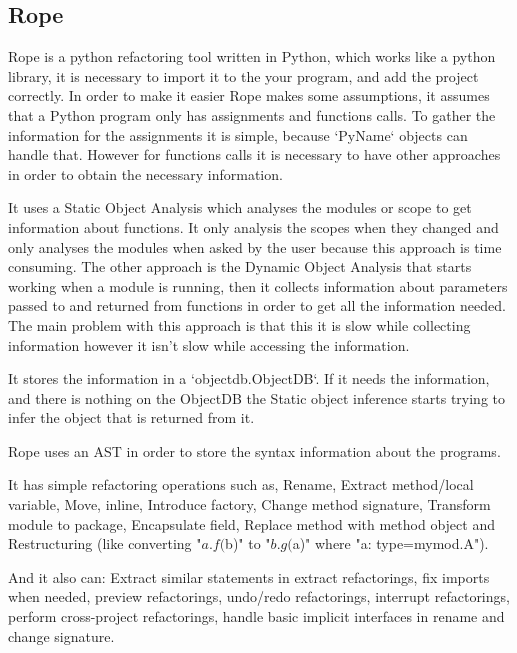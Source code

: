 
\subsection{Rope}

Rope is a python refactoring tool written in Python, which works like a python library, it is necessary to import it to the your program, and add the project correctly.
In order to make it easier Rope makes some assumptions, it assumes that a Python program only has assignments and functions calls. %
To gather the information for the assignments it is simple, because `PyName` objects can handle that. However for functions calls it is necessary to have other approaches in order to obtain the necessary information. 

It uses a Static Object Analysis which analyses the modules or scope to get information about functions. It only analysis the scopes when they changed and only analyses the modules when asked by the user because this approach is time consuming. The other approach is the Dynamic Object Analysis that starts working when a module is running, then it collects information about parameters passed to and returned from functions in order to get all the information needed. The main problem with this approach is that this it is slow while collecting information however it isn't slow while accessing the information.

It stores the information in a `objectdb.ObjectDB`. If it needs the information, and there is nothing on the ObjectDB the Static object inference starts trying to infer the object that is returned from it.

Rope uses an AST in order to store the syntax information about the programs.

It has simple refactoring operations such as, Rename, Extract method/local variable, Move, inline, Introduce factory, Change method signature, Transform module to package, Encapsulate field, Replace method with method object and Restructuring (like converting "${a}.f(${b})" to "${b}.g(${a})" where "a: type=mymod.A").

And it also can: Extract similar statements in extract refactorings, fix imports when needed, preview refactorings, undo/redo refactorings, interrupt refactorings, perform cross-project refactorings, handle basic implicit interfaces in rename and change signature.




